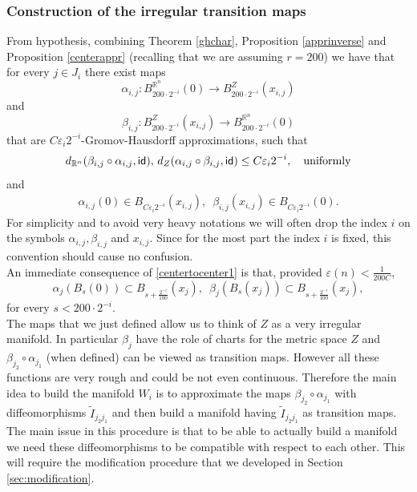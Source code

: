 \documentclass[11pt]{article}
\newcommand{\eps}{\varepsilon}
\newcommand{\rr}{\mathbb{R}}
\newcommand{\id}{{\sf id}}
\theoremstyle{plain}
\theoremstyle{definition}
\numberwithin{equation}{section}
\begin{document}
\subsubsection{Construction of the irregular transition maps}\label{sec:irr charts}
From  hypothesis, combining Theorem \ref{ghchar}, Proposition \ref{apprinverse} and Proposition \ref{centerappr} (recalling that we are assuming $r=200$) we have that for every $j \in J_i$ there exist maps $$\alpha_{i,j} : B^{\rr^n}_{200\cdot 2^{-i}}(0) \to B^{Z}_{200\cdot 2^{-i}}(x_{i,j})$$ and $$\beta_{i,j}: B^{Z}_{200\cdot 2^{-i}}(x_{i,j}) \to B^{\rr^n}_{200\cdot 2^{-i}}(0)$$ that are $C \eps_i 2^{-i}$-Gromov-Hausdorff approximations, such that 
\begin{equation}\label{alfabeta}
	d_{\rr^n}(\beta_{i,j}\circ \alpha_{i,j},\id), \, d_Z(\alpha_{i,j}\circ \beta_{i,j},\id)\le C\eps_i 2^{-i}, \quad \text{uniformly}
\end{equation}
and
\begin{eqnarray}\label{centertocenter1}
	\alpha_{i,j}(0)\in B_{C \eps_i 2^{-i}}(x_{i,j}),\,\,\, \beta_{i,j}(x_{i,j})\in B_{C \eps_i 2^{-i}}(0).
\end{eqnarray}
For simplicity and to avoid very heavy notations we will often drop the index $i$ on the symbols $\alpha_{i,j},\beta_{i,j}$ and $x_{i,j}.$ Since for the most part the index $i$ is fixed, this convention should cause no confusion. \\
An immediate consequence of \eqref{centertocenter1} is that, provided $\eps(n) < \frac{1}{200C}$,
\begin{equation}\label{centertocenter}
	\alpha_{j}(B_{s}(0))\subset B_{s+\frac{2^{-i}}{100}}(x_{j}), \,\,\, \beta_{j}(B_{s}(x_{j}))\subset B_{s+\frac{2^{-i}}{100}}(x_{j}),
\end{equation}
for every $s<200 \cdot 2^{-i}.$\\

The maps that we just defined allow us to think of $Z$ as a very irregular manifold. In particular  $\beta_j$ have the role of charts for the metric space $Z$ and  $\beta_{j_2} \circ \alpha_{j_1}$ (when defined) can be viewed as transition maps. However all these functions are very rough and could be not even continuous. Therefore the main idea to build the manifold $W_i$ is to approximate the maps $\beta_{j_2} \circ \alpha_{j_1}$ with diffeomorphisms $\tilde I_{j_2j_1}$ and then build a manifold having   $\tilde I_{j_2j_1}$  as transition maps. The main issue in this procedure is that to be able to actually build a manifold we need these diffeomorphisms to be compatible with respect to each other. This will require the modification procedure that we developed in Section \ref{sec:modification}. 
\end{document}
